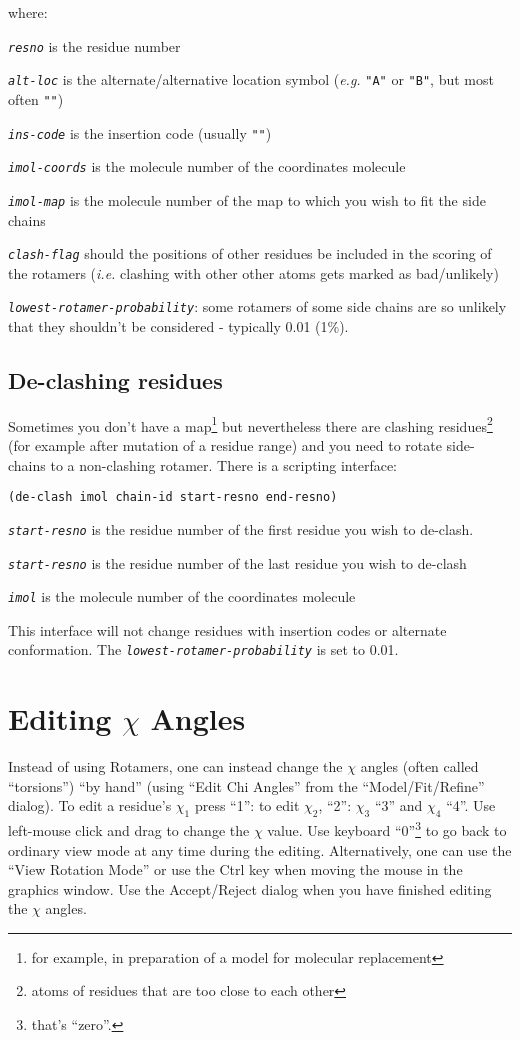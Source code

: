 \documentclass{book}
\begin{document}
where:

\texttt{\emph{resno}} is the residue number

\texttt{\emph{alt-loc}} is the alternate/alternative location symbol
(\emph{e.g.} \texttt{"A"} or \texttt{"B"}, but most often \texttt{""})

\texttt{\emph{ins-code}} is the insertion code (usually \texttt{""})

\texttt{\emph{imol-coords}} is the molecule number of the coordinates molecule

\texttt{\emph{imol-map}} is the molecule number of the map to which
you wish to fit the side chains

\texttt{\emph{clash-flag}} should the positions of other residues be
included in the scoring of the rotamers (\emph{i.e.} clashing with other
other atoms gets marked as bad/unlikely)

\texttt{\emph{lowest-rotamer-probability}}: some rotamers of some side
chains are so unlikely that they shouldn't be considered - typically
0.01 (1\%).

\subsection{De-clashing residues}
Sometimes you don't have a map\footnote{for example, in preparation of
  a model for molecular replacement} but nevertheless there are
clashing residues\footnote{atoms of residues
  that are too close to each other} (for example after mutation of a
residue range) and you need to rotate side-chains to a non-clashing
rotamer.  There is a scripting interface:

\texttt{(de-clash \texttt{imol chain-id start-resno end-resno})}

\texttt{\emph{start-resno}} is the residue number of the first residue
you wish to de-clash.

\texttt{\emph{start-resno}} is the residue number of the last residue
you wish to de-clash

\texttt{\emph{imol}} is the molecule number of the coordinates molecule

This interface will not change residues with insertion codes or
alternate conformation.  The
\texttt{\emph{lowest-rotamer-probability}} is set to 0.01.


\section{Editing $\chi$ Angles}
Instead of using Rotamers, one can instead
change the $\chi$ angles (often called ``torsions'')
``by hand'' (using ``Edit Chi Angles'' from the ``Model/Fit/Refine''
dialog). To edit a residue's $\chi_1$ press ``1'': to edit $\chi_2$,
``2'': $\chi_3$ ``3'' and $\chi_4$ ``4''.  Use left-mouse click and
drag to change the $\chi$ value.  Use keyboard ``0''\footnote{that's
  ``zero''.} to go back to ordinary view mode at any time during the
editing.  Alternatively, one can use the ``View Rotation Mode'' or use
the Ctrl key when moving the mouse in the graphics window.  Use the
Accept/Reject dialog when you have finished editing the $\chi$ angles.
\end{document}
